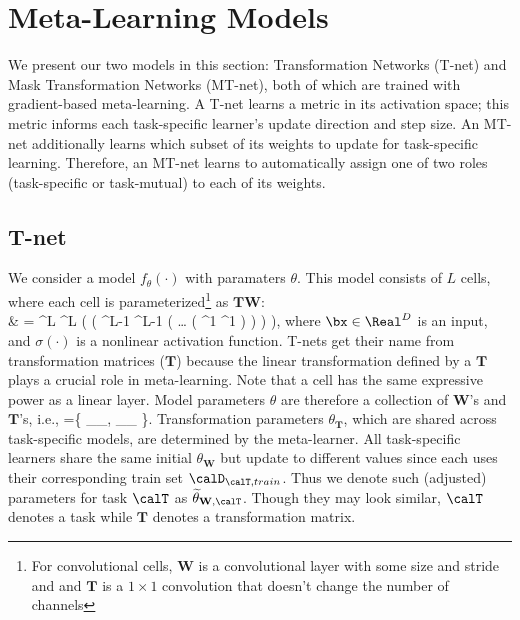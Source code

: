 \documentclass{article}
\newcommand{\x}{\mathbf{x}}
\newcommand{\W}{\mathbf{W}}
\newcommand{\T}{\mathbf{T}}
\begin{document}
\section{Meta-Learning Models}
\label{sec:main}

We present our two models in this section: Transformation Networks (T-net) and Mask Transformation Networks (MT-net),
 both of which are trained with gradient-based meta-learning.
A T-net learns a metric in its activation space;
this metric informs each task-specific learner's update direction and step size.
An MT-net additionally learns which subset of its weights to update for task-specific learning.
Therefore, an MT-net learns to automatically assign one of two roles (task-specific or task-mutual) to each of its weights.


\subsection{T-net}
\label{subsec:tnet}

We consider a model $f_{\theta} (\cdot)$ with paramaters $\theta$.
This model consists of $L$ cells, where each cell is parameterized\footnote{
For convolutional cells, $\W$ is a convolutional layer with some size and stride and
and $\T$ is a $1 \times 1$ convolution that doesn't change the number of channels
} as $\T \W$:
\be
\label{eq:tmodel}
\lefteqn{ f_{\theta}(\x)} \nonumber \\
& =  \T^L \W^L \left( \sigma \left( \T^{L-1} \W^{L-1} \left( \ldots 
\sigma \left(  \T^1 \W^1 \x \right) \right) \right) \right),  
\ee
where $\bx \in \Real^{D}$ is an input, and $\sigma(\cdot)$ is a nonlinear activation function.
T-nets get their name from transformation matrices ($\T$) because the linear transformation defined by a $\T$ plays a crucial role in meta-learning.
Note that a cell has the same expressive power as a linear layer.
Model parameters $\theta$ are therefore a collection of $\W$'s and $\T$'s, i.e.,
\bee
\theta =\left\{ \underbrace{\W^1, \ldots, \W^L}_{\theta_{\W}}, 
\underbrace{\T^1, \ldots, \T^L}_{\theta_{\T}}  \right\}.
\eee
Transformation parameters $\theta_{\T}$, which are shared across task-specific models, are determined by the meta-learner.
All task-specific learners share the same initial $\theta_{\W}$ but update to different values since each uses their corresponding train set $\calD_{\calT,train}$.
Thus we denote such (adjusted) parameters for task $\calT$ as $\widetilde{\theta}_{\W,\calT}$.
Though they may look similar, $\calT$ denotes a task while $\T$ denotes a transformation matrix.
\end{document}
